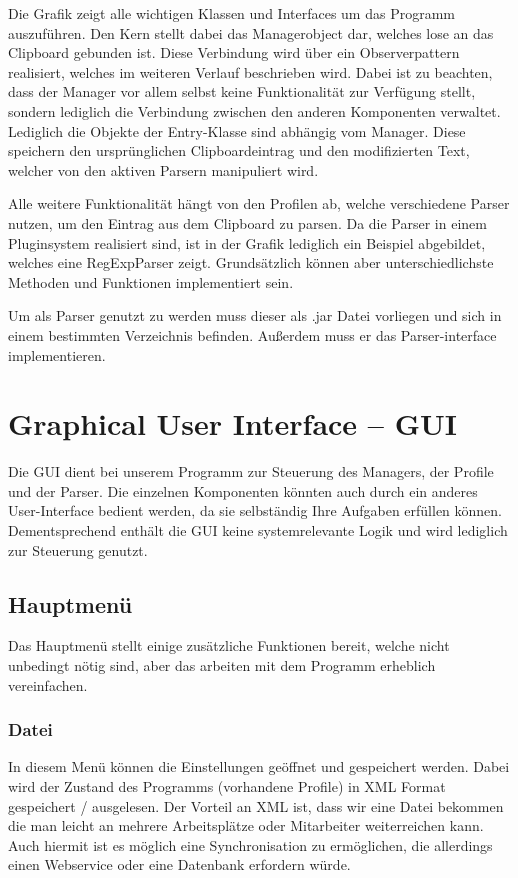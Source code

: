 \documentclass[a4paper,11pt,abstracton,titlepage]{scrartcl}
\begin{document}
Die Grafik zeigt alle wichtigen Klassen und Interfaces um das Programm
auszuführen. Den Kern stellt dabei das Managerobject dar, welches lose an das
Clipboard gebunden ist. Diese Verbindung wird über ein Observerpattern
realisiert, welches im weiteren Verlauf beschrieben wird. Dabei ist zu beachten,
dass der Manager vor allem selbst keine Funktionalität zur Verfügung stellt,
sondern lediglich die Verbindung zwischen den anderen Komponenten verwaltet.
Lediglich die Objekte der Entry-Klasse sind abhängig vom Manager. Diese
speichern den ursprünglichen Clipboardeintrag und den modifizierten Text,
welcher von den aktiven Parsern manipuliert wird.

Alle weitere Funktionalität hängt von den Profilen ab, welche verschiedene
Parser nutzen, um den Eintrag aus dem Clipboard zu parsen. Da die Parser in
einem Pluginsystem realisiert sind, ist in der Grafik lediglich ein Beispiel
abgebildet, welches eine RegExpParser zeigt. Grundsätzlich können aber
unterschiedlichste Methoden und Funktionen implementiert sein.

Um als Parser genutzt zu werden muss dieser als .jar Datei vorliegen und sich in
einem bestimmten Verzeichnis befinden. Außerdem muss er das Parser-interface
implementieren.


\section{Graphical User Interface -- GUI}
Die GUI dient bei unserem Programm zur Steuerung des Managers, der Profile und
der Parser. Die einzelnen Komponenten könnten auch durch ein anderes
User-Interface bedient werden, da sie selbständig Ihre Aufgaben erfüllen können.
Dementsprechend enthält die GUI keine systemrelevante Logik und wird lediglich
zur Steuerung genutzt.

\subsection{Hauptmenü}
Das Hauptmenü stellt einige zusätzliche Funktionen bereit, welche nicht
unbedingt nötig sind, aber das arbeiten mit dem Programm erheblich vereinfachen.
\subsubsection{Datei}
In diesem Menü können die Einstellungen geöffnet und gespeichert werden. Dabei
wird der Zustand des Programms (vorhandene Profile) in XML Format gespeichert /
ausgelesen. Der Vorteil an XML ist, dass wir eine Datei bekommen die man leicht
an mehrere Arbeitsplätze oder Mitarbeiter weiterreichen kann. Auch hiermit ist
es möglich eine Synchronisation zu ermöglichen, die allerdings einen Webservice
oder eine Datenbank erfordern würde.
\end{document}
